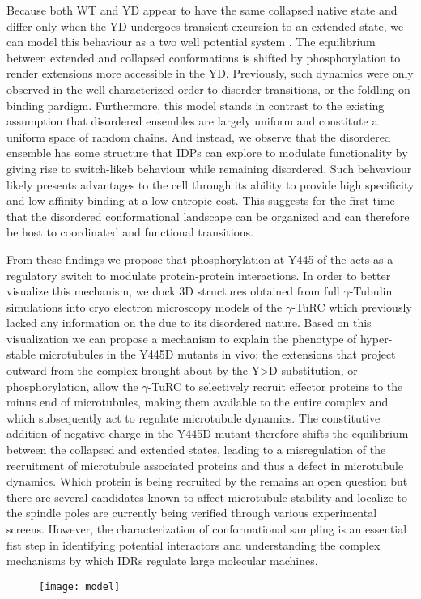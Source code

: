  Because both WT and YD appear to have the same collapsed native state and differ only when the YD undergoes transient excursion to an extended state, we can model this behaviour as a two well potential system . The equilibrium between extended and collapsed conformations is shifted by phosphorylation to render extensions more accessible in the YD.  Previously, such dynamics were only observed in the well characterized order-to disorder transitions, or the foldling on binding pardigm. Furthermore, this model stands in contrast to the existing assumption that disordered ensembles are largely uniform  and constitute a uniform space of random chains. And instead, we observe that the disordered ensemble has some structure that IDPs can explore to modulate functionality by giving rise to switch-likeb behaviour while remaining disordered. Such behvaviour likely presents advantages to the cell through its ability to provide high specificity and low affinity binding at a low entropic cost. This suggests for the first time that the disordered conformational landscape can be organized and can therefore be host to coordinated and functional transitions.

\begin{figure}
\centering     %
{}
\label{fig:wells}
\end{figure}

From these findings we propose that phosphorylation at Y445 of the \gct acts as a regulatory switch to modulate protein-protein interactions. In order to better visualize this mechanism, we dock 3D structures obtained from full $\gamma$-Tubulin simulations into cryo electron microscopy models of the $\gamma$-TuRC  which previously lacked any information on the \gct due to its disordered nature. Based on this visualization we can propose a mechanism to explain the phenotype of hyper-stable microtubules in the Y445D mutants in vivo; the extensions that project outward from the complex brought about by the Y>D substitution, or phosphorylation, allow the $\gamma$-TuRC to selectively recruit effector proteins to the minus end of microtubules, making them available to the entire complex and which subsequently act to regulate microtubule dynamics. The constitutive addition of negative charge in the Y445D mutant therefore shifts the equilibrium between the collapsed and extended states, leading to a misregulation of the recruitment of microtubule associated proteins and thus a defect in microtubule dynamics. Which protein is being recruited by the \gct remains an open question but there are several candidates known to affect microtubule stability and localize to the spindle poles  are currently being verified through various experimental screens. However, the characterization of \gct conformational sampling  is an essential fist step in identifying potential interactors and understanding the complex mechanisms by which IDRs regulate large molecular machines.

\begin{figure}
\centering
\texttt{[image: model]}
\label{fig:turc}
\end{figure}